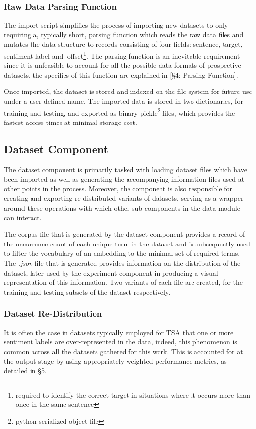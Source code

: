 \documentclass[12pt, a4paper]{report}
\theoremstyle{definition}
\theoremstyle{definition}%
\theoremstyle{definition}%
\theoremstyle{definition}%
\theoremstyle{definition}%
\theoremstyle{definition}%
\begin{document}
\subsubsection{Raw Data Parsing Function}
The import script simplifies the process of importing new datasets to only requiring a, typically short, parsing function which reads the raw data files and mutates the data structure to records consisting of four fields: sentence, target, sentiment label and, offset\footnote{required to identify the correct target in situations where it occurs more than once in the same sentence}. The parsing function is an inevitable requirement since it is unfeasible to account for all the possible data formats of prospective datasets, the specifics of this function are explained in [\S4: Parsing Function]. 

Once imported, the dataset is stored and indexed on the file-system for future use under a user-defined name. The imported data is stored in two dictionaries, for training and testing, and exported as binary pickle\footnote{python serialized object file} files, which provides the fastest access times at minimal storage cost. 

\subsection{Dataset Component}
The dataset component is primarily tasked with loading dataset files which have been imported as well as generating the accompanying information files used at other points in the process. Moreover, the component is also responsible for creating and exporting re-distributed variants of datasets, serving as a wrapper around these operations with which other sub-components in the data module can interact. 

The corpus file that is generated by the dataset component provides a record of the occurrence count of each unique term in the dataset and is subsequently used to filter the vocabulary of an embedding to the minimal set of required terms. The \textit{.json} file that is generated provides information on the distribution of the dataset, later used by the experiment component in producing a visual representation of this information. Two variants of each file are created, for the training and testing subsets of the dataset respectively.

\subsubsection{Dataset Re-Distribution}
It is often the case in datasets typically employed for TSA that one or more sentiment labels are over-represented in the data, indeed, this phenomenon is common across all the datasets gathered for this work. This is accounted for at the output stage by using appropriately weighted performance metrics, as detailed in \S5. 
\end{document}
